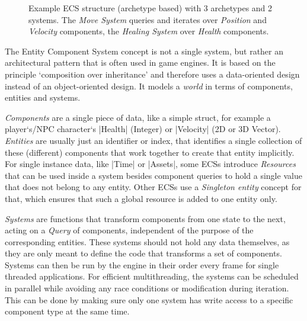 \begin{figure}[h!]
\caption{Example ECS structure (archetype based) with 3 archetypes and 2 systems. The \textit{Move System} queries and iterates over \textit{Position} and \textit{Velocity} components, the \textit{Healing System} over \textit{Health} components.}
\label{fig:ecs}
\end{figure}

The Entity Component System concept is not a single system, but rather an architectural pattern that is often used in game engines. It is based on the principle `composition over inheritance' and therefore uses a data-oriented design instead of an object-oriented design. It models a \textit{world} in terms of components, entities and systems.

\textit{Components} are a single piece of data, like a simple struct, for example a player`s/NPC character`s |Health| (Integer) or |Velocity| (2D or 3D Vector). \textit{Entities} are usually just an identifier or index, that identifies a single collection of these (different) components that work together to create that entity implicitly. For single instance data, like |Time| or |Assets|, some ECSs introduce \textit{Resources} that can be used inside a system besides component queries to hold a single value that does not belong to any entity. Other ECSs use a \textit{Singleton entity} concept for that, which ensures that such a global resource is added to one entity only.

\textit{Systems} are functions that transform components from one state to the next, acting on a \textit{Query} of components, independent of the purpose of the corresponding entities. These systems should not hold any data themselves, as they are only meant to define the code that transforms a set of components. Systems can then be run by the engine in their order every frame for single threaded applications. For efficient multithreading, the systems can be scheduled in parallel while avoiding any race conditions or modification during iteration. This can be done by making sure only one system has write access to a specific component type at the same time.

